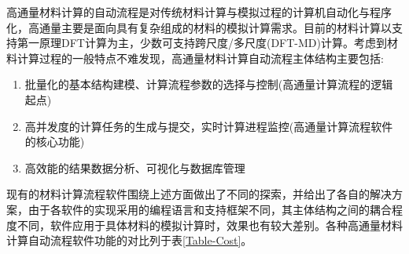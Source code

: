 高通量材料计算的自动流程是对传统材料计算与模拟过程的计算机自动化与程序化，高通量主要是面向具有复杂组成的材料的模拟计算需求。目前的材料计算以支持第一原理\textrm{DFT}计算为主，少数可支持跨尺度/多尺度\textrm{(DFT-MD)}计算。考虑到材料计算过程的一般特点不难发现，高通量材料计算自动流程主体结构主要包括: 
\begin{enumerate}
	\item 批量化的基本结构建模、计算流程参数的选择与控制(高通量计算流程的逻辑起点)
	\item 高并发度的计算任务的生成与提交，实时计算进程监控(高通量计算流程软件的核心功能)
	\item 高效能的结果数据分析、可视化与数据库管理 
\end{enumerate}
现有的材料计算流程软件围绕上述方面做出了不同的探索，并给出了各自的解决方案，由于各软件的实现采用的编程语言和支持框架不同，其主体结构之间的耦合程度不同，软件应用于具体材料的模拟计算时，效果也有较大差别。各种高通量材料计算自动流程软件功能的对比列于表\ref{Table-Cost}。
